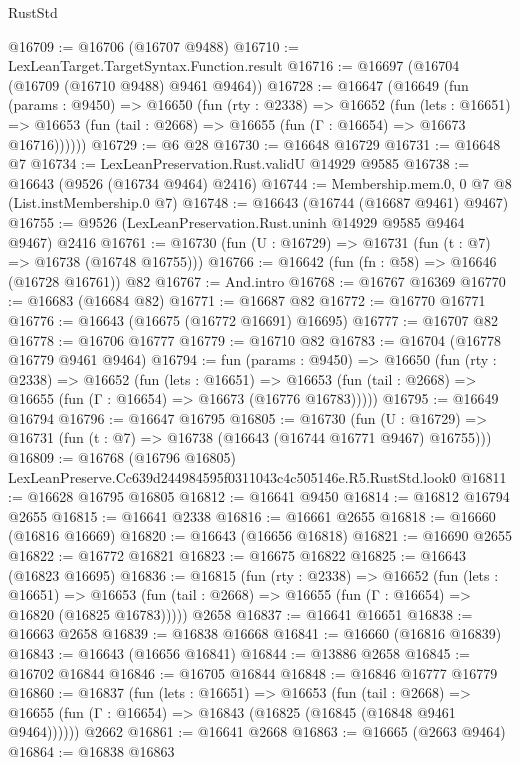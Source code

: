 \begin{lexlean}{RustStd}
\begin{coremodule}
@16709 := @16706 (@16707 @9488)
@16710 := LexLeanTarget.TargetSyntax.Function.result
@16716 := @16697 (@16704 (@16709 (@16710 @9488) @9461 @9464))
@16728 := @16647
    (@16649
      (fun (params : @9450) =>
      @16650
        (fun (rty : @2338) =>
        @16652
          (fun (lets : @16651) =>
          @16653 (fun (tail : @2668) => @16655 (fun (Γ : @16654) => @16673 @16716))))))
@16729 := @6 @28
@16730 := @16648 @16729
@16731 := @16648 @7
@16734 := LexLeanPreservation.Rust.validU @14929 @9585
@16738 := @16643 (@9526 (@16734 @9464) @2416)
@16744 := Membership.mem.{0, 0} @7 @8 (List.instMembership.{0} @7)
@16748 := @16643 (@16744 (@16687 @9461) @9467)
@16755 := @9526 (LexLeanPreservation.Rust.uninh @14929 @9585 @9464 @9467) @2416
@16761 := @16730 (fun (U : @16729) => @16731 (fun (t : @7) => @16738 (@16748 @16755)))
@16766 := @16642 (fun (fn : @58) => @16646 (@16728 @16761)) @82
@16767 := And.intro
@16768 := @16767 @16369
@16770 := @16683 (@16684 @82)
@16771 := @16687 @82
@16772 := @16770 @16771
@16776 := @16643 (@16675 (@16772 @16691) @16695)
@16777 := @16707 @82
@16778 := @16706 @16777
@16779 := @16710 @82
@16783 := @16704 (@16778 @16779 @9461 @9464)
@16794 := fun (params : @9450) =>
  @16650
    (fun (rty : @2338) =>
    @16652
      (fun (lets : @16651) =>
      @16653 (fun (tail : @2668) => @16655 (fun (Γ : @16654) => @16673 (@16776 @16783)))))
@16795 := @16649 @16794
@16796 := @16647 @16795
@16805 := @16730
    (fun (U : @16729) => @16731 (fun (t : @7) => @16738 (@16643 (@16744 @16771 @9467) @16755)))
@16809 := @16768 (@16796 @16805) LexLeanPreserve.Cc639d244984595f0311043c4c505146e.R5.RustStd.look0
@16811 := @16628 @16795 @16805
@16812 := @16641 @9450
@16814 := @16812 @16794 @2655
@16815 := @16641 @2338
@16816 := @16661 @2655
@16818 := @16660 (@16816 @16669)
@16820 := @16643 (@16656 @16818)
@16821 := @16690 @2655
@16822 := @16772 @16821
@16823 := @16675 @16822
@16825 := @16643 (@16823 @16695)
@16836 := @16815
    (fun (rty : @2338) =>
    @16652
      (fun (lets : @16651) =>
      @16653 (fun (tail : @2668) => @16655 (fun (Γ : @16654) => @16820 (@16825 @16783)))))
    @2658
@16837 := @16641 @16651
@16838 := @16663 @2658
@16839 := @16838 @16668
@16841 := @16660 (@16816 @16839)
@16843 := @16643 (@16656 @16841)
@16844 := @13886 @2658
@16845 := @16702 @16844
@16846 := @16705 @16844
@16848 := @16846 @16777 @16779
@16860 := @16837
    (fun (lets : @16651) =>
    @16653
      (fun (tail : @2668) =>
      @16655 (fun (Γ : @16654) => @16843 (@16825 (@16845 (@16848 @9461 @9464))))))
    @2662
@16861 := @16641 @2668
@16863 := @16665 (@2663 @9464)
@16864 := @16838 @16863

\end{coremodule}
\end{lexlean}
